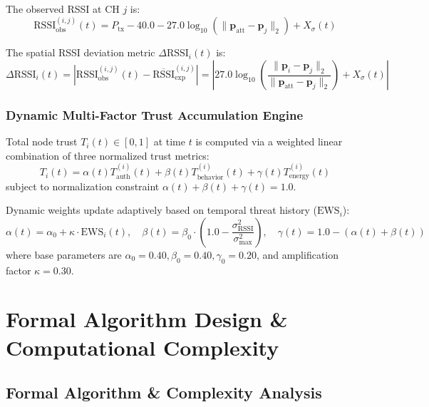 \documentclass[11pt,a4paper,oneside]{book}
\begin{document}
The observed RSSI at CH $j$ is:
\begin{equation}
\text{RSSI}_{\text{obs}}^{(i, j)}(t) = P_{\text{tx}} - 40.0 - 27.0 \log_{10}\left(\|\boldsymbol{p}_{\text{att}} - \boldsymbol{p}_j\|_2\right) + X_{\sigma}(t)
\end{equation}

The spatial RSSI deviation metric $\Delta\text{RSSI}_i(t)$ is:
\begin{equation}
\Delta\text{RSSI}_i(t) = \left| \text{RSSI}_{\text{obs}}^{(i, j)}(t) - \overline{\text{RSSI}}_{\text{exp}}^{(i, j)} \right| = \left| 27.0 \log_{10}\left( \frac{\|\boldsymbol{p}_i - \boldsymbol{p}_j\|_2}{\|\boldsymbol{p}_{\text{att}} - \boldsymbol{p}_j\|_2} \right) + X_{\sigma}(t) \right|
\end{equation}

\section{Dynamic Multi-Factor Trust Accumulation Engine}
Total node trust $T_i(t) \in [0, 1]$ at time $t$ is computed via a weighted linear combination of three normalized trust metrics:
\begin{equation}
T_i(t) = \alpha(t) T_{\text{auth}}^{(i)}(t) + \beta(t) T_{\text{behavior}}^{(i)}(t) + \gamma(t) T_{\text{energy}}^{(i)}(t)
\end{equation}
subject to normalization constraint $\alpha(t) + \beta(t) + \gamma(t) = 1.0$.

Dynamic weights update adaptively based on temporal threat history ($\text{EWS}_i$):
\begin{equation}
\alpha(t) = \alpha_0 + \kappa \cdot \text{EWS}_i(t), \quad \beta(t) = \beta_0 \cdot \left(1.0 - \frac{\sigma_{\text{RSSI}}^2}{\sigma_{\text{max}}^2}\right), \quad \gamma(t) = 1.0 - (\alpha(t) + \beta(t))
\end{equation}
where base parameters are $\alpha_0 = 0.40, \beta_0 = 0.40, \gamma_0 = 0.20$, and amplification factor $\kappa = 0.30$.

\part{Formal Algorithm Design \& Computational Complexity}

\chapter{Formal Algorithm \& Complexity Analysis}
\end{document}
